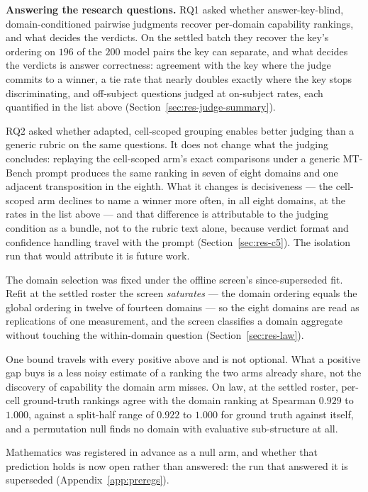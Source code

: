 \textbf{Answering the research questions.}
RQ1 asked whether answer-key-blind, domain-conditioned pairwise
judgments recover per-domain capability rankings, and what decides the
verdicts. On the settled batch they recover the key's ordering on
$196$ of the $200$ model pairs the key can separate, and what decides
the verdicts is answer correctness: agreement with the key where the
judge commits to a winner, a tie rate that nearly doubles exactly
where the key stops discriminating, and off-subject questions judged
at on-subject rates, each quantified in the list above
(Section~\ref{sec:res-judge-summary}).

RQ2 asked whether adapted, cell-scoped grouping enables better judging
than a generic rubric on the same questions. It does not change what
the judging concludes: replaying the cell-scoped arm's exact
comparisons under a generic MT-Bench prompt produces the same ranking
in seven of eight domains and one adjacent transposition in the
eighth. What it changes is decisiveness --- the cell-scoped arm
declines to name a winner more often, in all eight domains, at the
rates in the list above --- and that difference is attributable
to the judging condition as a bundle, not to the rubric text alone,
because verdict format and confidence handling travel with the prompt
(Section~\ref{sec:res-c5}). The isolation run that would attribute it
is future work.

The domain selection was fixed under the offline screen's
since-superseded fit. Refit at the settled roster the screen
\emph{saturates} --- the domain ordering
equals the global ordering in twelve of fourteen domains --- so the
eight domains are read as replications of one measurement, and the
screen classifies a domain aggregate without touching the
within-domain question (Section~\ref{sec:res-law}).

One bound travels with every positive above and is not optional. What a
positive gap buys is a less noisy estimate of a ranking the two arms
already share, not the discovery of capability the domain arm misses.
On law, at the settled roster, per-cell ground-truth rankings agree
with the domain ranking at Spearman $0.929$ to $1.000$, against a
split-half range of $0.922$ to $1.000$ for ground truth against
itself, and a permutation null finds no domain with evaluative
sub-structure at all.

Mathematics was registered in advance as a null arm, and whether that
prediction holds is now open rather than answered: the run that answered it
is superseded (Appendix~\ref{app:preregs}).

